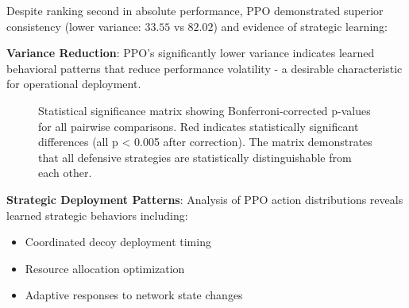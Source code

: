 \documentclass[12pt,twoside]{article}
\theoremstyle{definition}
\theoremstyle{plain}
\begin{document}
Despite ranking second in absolute performance, PPO demonstrated superior consistency (lower variance: $33.55$ vs $82.02$) and evidence of strategic learning:

\textbf{Variance Reduction}: PPO's significantly lower variance indicates learned behavioral patterns that reduce performance volatility - a desirable characteristic for operational deployment.

\begin{figure}[H]
\centering
{}
\caption{Statistical significance matrix showing Bonferroni-corrected p-values for all pairwise comparisons. Red indicates statistically significant differences (all p < 0.005 after correction). The matrix demonstrates that all defensive strategies are statistically distinguishable from each other.}
\label{fig:significance_matrix}
\end{figure}

\textbf{Strategic Deployment Patterns}: Analysis of PPO action distributions reveals learned strategic behaviors including:
\begin{itemize}
    \item Coordinated decoy deployment timing
    \item Resource allocation optimization
    \item Adaptive responses to network state changes
\end{itemize}
\end{document}
